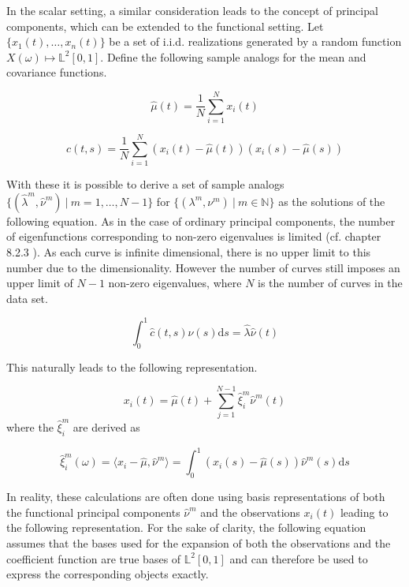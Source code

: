\documentclass[11pt,twoside,a4paper]{article}
\begin{document}
	In the scalar setting, a similar consideration leads to the concept of principal components, which can be extended to the functional setting. Let $\{x_1(t), \dots, x_n(t)\}$ be a set of i.i.d. realizations generated by a random function $X(\omega) \mapsto \mathbb{L}^2[0,1]$.
	Define the following sample analogs for the mean and covariance functions.
	
	\begin{equation}
		\hat{\mu}(t) = \frac{1}{N}\sum_{i = 1}^{N}x_i(t)
	\end{equation}
	
	\begin{equation}
		\hat{c}(t,s) = \frac{1}{N} \sum_{i = 1}^{N} \left(x_i(t) - \hat{\mu}(t)\right) \left(x_i(s) - \hat{\mu}(s)\right)
	\end{equation}
	
	With these it is possible to derive a set of sample analogs $\{(\hat{\lambda}^m, \hat{\nu}^m) \: \vert \: m = 1, \dots, N-1\}$ for $\{(\lambda^m, \nu^m) \: \vert \: m \in \mathbb{N}\}$ as the solutions of the following equation. As in the case of ordinary principal components, the number of eigenfunctions corresponding to non-zero eigenvalues is limited (cf. chapter 8.2.3 \cite{ramsay_functional_2005}). As each curve is infinite dimensional, there is no upper limit to this number due to the dimensionality. However the number of curves still imposes an upper limit of $N-1$ non-zero eigenvalues, where $N$ is the number of curves in the data set.
	
	\begin{equation}
		\int_{0}^{1}\hat{c}(t,s)\hat{\nu}(s) \mathrm{d}s = \hat{\lambda} \hat{\nu}(t)
	\end{equation}
	
	This naturally leads to the following representation.
	
	\begin{equation}
		x_i(t) = \hat{\mu}(t) + \sum_{j = 1}^{N-1} \hat{\xi}_{i}^{m} \hat{\nu}^{m}(t)
	\end{equation}
	where the $\hat{\xi}_{i}^m$ are derived as 
	
	\begin{equation}
		\hat{\xi}_i^m(\omega) = \langle x_i - \hat{\mu}, \hat{\nu}^m\rangle = \int_{0}^{1} \left(x_i(s) - \hat{\mu}(s)\right) \hat{\nu}^m(s) \mathrm{d}s
	\end{equation}
	
	In reality, these calculations are often done using basis representations of both the functional principal components $\hat{\nu}^m$ and the observations $x_i(t)$ leading to the following representation. For the sake of clarity, the following equation assumes that the bases used for the expansion of both the observations and the coefficient function are true bases of $\mathbb{L}^2[0,1]$ and can therefore be used to express the corresponding objects exactly.
	
\end{document}
